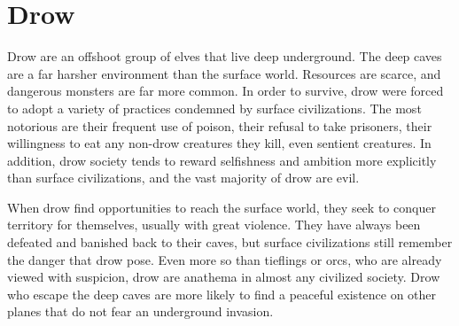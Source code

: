 \section{Drow}

    Drow are an offshoot group of elves that live deep underground.
    The deep caves are a far harsher environment than the surface world.
    Resources are scarce, and dangerous monsters are far more common.
    In order to survive, drow were forced to adopt a variety of practices condemned by surface civilizations.
    The most notorious are their frequent use of poison, their refusal to take prisoners, their willingness to eat any non-drow creatures they kill, even sentient creatures.
    In addition, drow society tends to reward selfishness and ambition more explicitly than surface civilizations, and the vast majority of drow are evil.

    When drow find opportunities to reach the surface world, they seek to conquer territory for themselves, usually with great violence.
    They have always been defeated and banished back to their caves, but surface civilizations still remember the danger that drow pose.
    Even more so than tieflings or orcs, who are already viewed with suspicion, drow are anathema in almost any civilized society.
    Drow who escape the deep caves are more likely to find a peaceful existence on other planes that do not fear an underground invasion.

